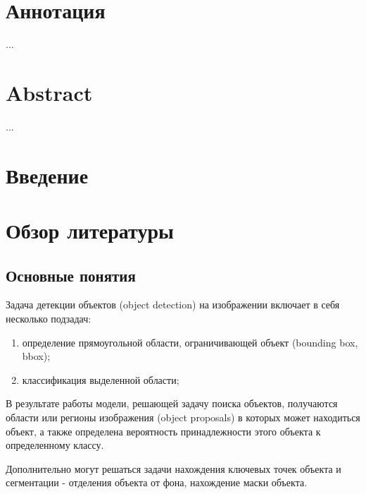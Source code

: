 \documentclass[a4paper,14pt]{article}
\begin{document}
	

    \section*{\normalsize \hfill Аннотация \hfill}

    ...

    \sloppy
    \newpage

    \section*{\normalsize \hfill Abstract \hfill}

    ...

    \newpage

    \tableofcontents
    \pagebreak

    \section*{Введение}


    \newpage


    \section{Обзор литературы}
    
    \subsection{Основные понятия}
    
    Задача детекции объектов (object detection) на изображении включает в себя несколько подзадач:
    \begin{enumerate}
    	[1)]
    	\itemsep0em
    	\item определение прямоугольной области, ограничивающей объект (bounding box, bbox); 
    	\item классификация выделенной области; 
    \end{enumerate}
	В результате работы модели, решающей задачу поиска объектов, получаются области или регионы изображения (object proposals) в которых может находиться объект, а также определена вероятность принадлежности этого объекта к определенному классу.
	
	Дополнительно могут решаться задачи нахождения ключевых точек объекта и сегментации - отделения объекта от фона, нахождение маски объекта.
	
\end{document}
